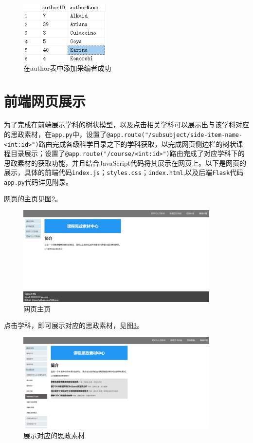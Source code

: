 \documentclass[11pt]{article}
\begin{document}
  \begin{figure}[h]
    \centering
    \includegraphics[width=0.4\textwidth]{useradd.png}
    \caption{在author表中添加采编者成功}
    \label{fig:useradd}
  \end{figure}


  
  \section{前端网页展示}
  为了完成在前端展示学科的树状模型，以及点击相关学科可以展示出与该学科对应的思政素材，在\verb|app.py|中，设置了\lstinline{@app.route("/subsubject/side-item-name-<int:id>")}路由完成各级科学目录之下的学科获取，以完成网页侧边栏的树状课程目录展示；设置了\verb|@app.route("/course/<int:id>")|路由完成了对应学科下的思政素材的获取功能，并且结合JavaScript代码将其展示在网页上。以下是网页的展示，具体的前端代码\verb|index.js|；\verb|styles.css|；\verb|index.html|,以及后端\verb|Flask|代码\verb|app.py|代码详见附录。

  网页的主页见图\ref{fig:home}。
  \begin{figure}[h]
    \centering
    \includegraphics[width=0.9\textwidth]{home.png}
    \caption{网页主页}
    \label{fig:home}
  \end{figure}

  点击学科，即可展示对应的思政素材，见图\ref{fig:onclick}。
  \begin{figure}[h]
    \centering
    \includegraphics[width=0.9\textwidth]{onclick.png}
    \caption{展示对应的思政素材}
    \label{fig:onclick}
  \end{figure}
\end{document}
